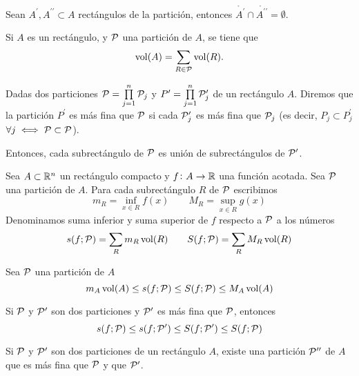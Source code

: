 \begin{obs*}
    Sean $A^\prime,A^{\prime\prime}\subset A$ rectángulos de la partición, entonces
    $\mathring{A^\prime} \cap \mathring{A^{\prime\prime}} = \emptyset$.
\end{obs*}

\begin{lema}
    Si $A$ es un rectángulo, y $\mathcal{P}$ una partición de $A$, se tiene que
    \[
        \operatorname{vol}(A) = \sum_{R \in \mathcal{P}} \operatorname{vol}(R).
    \]
\end{lema}

\begin{defi}
    Dadas dos particiones $\mathcal{P} = \prod\limits^n_{j=1} \mathcal{P}_j$ y
    $P^\prime = \prod\limits^n_{j=1} \mathcal{P}^\prime_j$ de un rectángulo $A$. Diremos
    que la partición $P^\prime$ es más fina que $\mathcal{P}$ si cada $\mathcal{P}^\prime_j$ es más
    fina que $\mathcal{P}_j$ (es decir, $P_j \subset P^\prime_j$ $\forall j \iff \mathcal{P}
    \subset \mathcal{P}$).

    Entonces, cada subrectángulo de $\mathcal{P}$ es unión de subrectángulos de
    $\mathcal{P}^\prime$.
\end{defi}

\begin{defi}
    Sea $A \subset \mathbb{R}^n$ un rectángulo compacto y $f \colon A \to \mathbb{R}$ una
    función acotada. Sea $\mathcal{P}$ una partición de $A$. Para cada subrectángulo $R$
    de $\mathcal{P}$ escribimos
    \[
        m_R = \inf_{x \in R} f(x) \qquad M_R = \sup_{x \in R} g(x)
    \]
    Denominamos suma inferior y suma superior de $f$ respecto a $\mathcal{P}$ a los números
    \[
        s(f;\mathcal{P}) = \sum_R m_R\operatorname{vol}(R) \qquad S(f;\mathcal{P}) = \sum_R M_R\operatorname{vol}(R)
    \]
\end{defi}

\begin{obs}
    Sea $\mathcal{P}$ una partición de $A$
    \[
        m_A\operatorname{vol}(A) \leq s(f;\mathcal{P}) \leq S(f;\mathcal{P}) \leq M_A\operatorname{vol}(A)
    \]
\end{obs}
\begin{obs}
    Si $\mathcal{P}$ y $\mathcal{P}^\prime$ son dos particiones y $\mathcal{P}^\prime$ es más fina que
    $\mathcal{P}$, entonces
    \[
        s(f;\mathcal{P}) \leq s(f;\mathcal{P}^\prime) \leq S(f;\mathcal{P}^\prime) \leq S(f;\mathcal{P})
    \]
\end{obs}

\begin{lema}
    Si $\mathcal{P}$ y $\mathcal{P}^\prime$ son dos particiones de un rectángulo $A$, existe una
    partición $\mathcal{P}^{\prime\prime}$ de $A$ que es más fina que $\mathcal{P}$ y que
    $\mathcal{P}^\prime$.
\end{lema}

